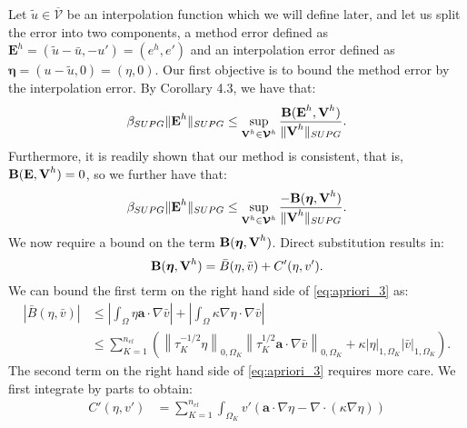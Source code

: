 \documentclass[11pt]{article}
\newenvironment{proof}[1][Proof]{\begin{trivlist}
\item[\hskip \labelsep {\bfseries #1}]}{\end{trivlist}}
\begin{document}
\begin{proof}
Let $\tilde{u} \in \overline{\mathcal{V}}$ be an interpolation function which we will define later, and let us split the error into two components, a method error defined as $\textbf{E}^h = (\tilde{u}-\bar{u},-u') = (e^h,e')$ and an interpolation error defined as $\boldsymbol{\eta} = (u-\tilde{u},0) = (\eta,0)$.  Our first objective is to bound the method error by the interpolation error.  By Corollary 4.3, we have that:
\begin{equation}
\beta_{SUPG} \| \textup{\textbf{E}}^h \|_{SUPG} \leq \sup_{\textup{\textbf{V}}^h \in \bm{\mathcal{V}}^h} \frac{\textup{\textbf{B}}(\textup{\textbf{E}}^h,\textup{\textbf{V}}^h)}{\| \textup{\textbf{V}}^h \|_{SUPG} }. \label{eq:apriori_1}
\end{equation}
Furthermore, it is readily shown that our method is consistent, that is, $\textup{\textbf{B}}(\textup{\textbf{E}},\textup{\textbf{V}}^h) = 0$, so we further have that:
\begin{equation}
\beta_{SUPG} \| \textup{\textbf{E}}^h \|_{SUPG} \leq \sup_{\textup{\textbf{V}}^h \in \bm{\mathcal{V}}^h} \frac{-\textup{\textbf{B}}(\boldsymbol{\eta},\textup{\textbf{V}}^h)}{\| \textup{\textbf{V}}^h \|_{SUPG} }. \label{eq:apriori_2}
\end{equation}
We now require a bound on the term $\textup{\textbf{B}}(\boldsymbol{\eta},\textup{\textbf{V}}^h)$.  Direct substitution results in:
\begin{equation}
\textup{\textbf{B}}(\boldsymbol{\eta},\textup{\textbf{V}}^h) = \bar{B}(\eta,\bar{v}) + C'(\eta,v'). \label{eq:apriori_3}
\end{equation}
We can bound the first term on the right hand side of \eqref{eq:apriori_3} as:
\begin{align}
|\bar{B}(\eta,\bar{v})| & \leq \left|\int_{\Omega} \eta \bm{a} \cdot \nabla \bar{v}\right| + \left|\int_{\Omega} \kappa \nabla \eta \cdot \nabla \bar{v}\right| \nonumber \\
& \leq \sum_{K=1}^{n_{el}} \left( \left\| \tau_K^{-1/2} \eta \right\|_{0,\Omega_K} \left\| \tau_K^{1/2} \bm{a} \cdot \nabla \bar{v} \right\|_{0,\Omega_K} + \kappa \left| \eta \right|_{1,\Omega_K} \left| \bar{v} \right|_{1,\Omega_K} \right). \label{eq:apriori_4}
\end{align}
The second term on the right hand side of \eqref{eq:apriori_3} requires more care.  We first integrate by parts to obtain:
\begin{align}
C'(\eta,v') &= \sum_{K=1}^{n_{el}} \int_{\Omega_K} v' \left( \bm{a} \cdot \nabla \eta  - \nabla \cdot \left( \kappa \nabla \eta \right) \right) \nonumber \\

\end{align}
\end{proof}
\end{document}
